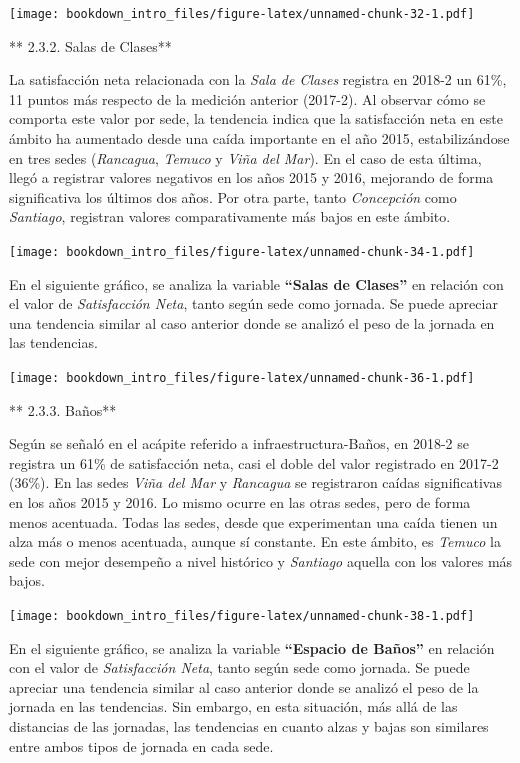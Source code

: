 \documentclass[]{book}
\begin{document}
\texttt{[image: bookdown\_intro\_files/figure-latex/unnamed-chunk-32-1.pdf]}

** 2.3.2. Salas de Clases**

La satisfacción neta relacionada con la \emph{Sala de Clases} registra
en 2018-2 un 61\%, 11 puntos más respecto de la medición anterior
(2017-2). Al observar cómo se comporta este valor por sede, la tendencia
indica que la satisfacción neta en este ámbito ha aumentado desde una
caída importante en el año 2015, estabilizándose en tres sedes
(\emph{Rancagua}, \emph{Temuco} y \emph{Viña del Mar}). En el caso de
esta última, llegó a registrar valores negativos en los años 2015 y
2016, mejorando de forma significativa los últimos dos años. Por otra
parte, tanto \emph{Concepción} como \emph{Santiago}, registran valores
comparativamente más bajos en este ámbito.

\texttt{[image: bookdown\_intro\_files/figure-latex/unnamed-chunk-34-1.pdf]}

En el siguiente gráfico, se analiza la variable \textbf{``Salas de
Clases''} en relación con el valor de \emph{Satisfacción Neta}, tanto
según sede como jornada. Se puede apreciar una tendencia similar al caso
anterior donde se analizó el peso de la jornada en las tendencias.

\texttt{[image: bookdown\_intro\_files/figure-latex/unnamed-chunk-36-1.pdf]}

** 2.3.3. Baños**

Según se señaló en el acápite referido a infraestructura-Baños, en
2018-2 se registra un 61\% de satisfacción neta, casi el doble del valor
registrado en 2017-2 (36\%). En las sedes \emph{Viña del Mar} y
\emph{Rancagua} se registraron caídas significativas en los años 2015 y
2016. Lo mismo ocurre en las otras sedes, pero de forma menos acentuada.
Todas las sedes, desde que experimentan una caída tienen un alza más o
menos acentuada, aunque sí constante. En este ámbito, es \emph{Temuco}
la sede con mejor desempeño a nivel histórico y \emph{Santiago} aquella
con los valores más bajos.

\texttt{[image: bookdown\_intro\_files/figure-latex/unnamed-chunk-38-1.pdf]}

En el siguiente gráfico, se analiza la variable \textbf{``Espacio de
Baños''} en relación con el valor de \emph{Satisfacción Neta}, tanto
según sede como jornada. Se puede apreciar una tendencia similar al caso
anterior donde se analizó el peso de la jornada en las tendencias. Sin
embargo, en esta situación, más allá de las distancias de las jornadas,
las tendencias en cuanto alzas y bajas son similares entre ambos tipos
de jornada en cada sede.
\end{document}
